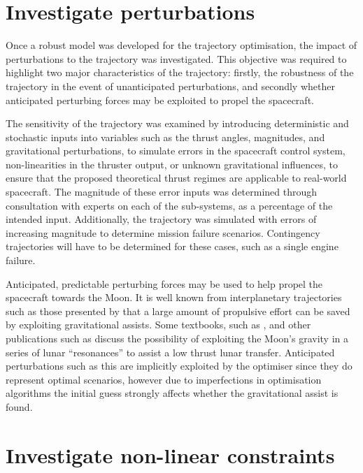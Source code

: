 \section{Investigate perturbations} \label{sec:Perturbation-objective}

Once a robust model was developed for the trajectory optimisation, the impact of perturbations to the trajectory was investigated. This objective was required to highlight two major characteristics of the trajectory: firstly, the robustness of the trajectory in the event of unanticipated perturbations, and secondly whether anticipated perturbing forces may be exploited to propel the spacecraft.

The sensitivity of the trajectory was examined by introducing deterministic and stochastic inputs into variables such as the thrust angles, magnitudes, and gravitational perturbations, to simulate errors in the spacecraft control system, non-linearities in the thruster output, or unknown gravitational influences, to ensure that the proposed theoretical thrust regimes are applicable to real-world spacecraft. The magnitude of these error inputs was determined through consultation with experts on each of the sub-systems, as a percentage of the intended input. Additionally, the trajectory was simulated with errors of increasing magnitude to determine mission failure scenarios. Contingency trajectories will have to be determined for these cases, such as a single engine failure.

Anticipated, predictable perturbing forces may be used to help propel the spacecraft towards the Moon. It is well known from interplanetary trajectories such as those presented by \textcite{Petukhov2007} that a large amount of propulsive effort can be saved by exploiting gravitational assists. Some textbooks, such as \textcite{Kemble2006}, and other publications such as \textcite{Letterio_thesis} discuss the possibility of exploiting the Moon's gravity in a series of lunar \enquote{resonances} to assist a low thrust lunar transfer. Anticipated perturbations such as this are implicitly exploited by the optimiser since they do represent optimal scenarios, however due to imperfections in optimisation algorithms the initial guess strongly affects whether the gravitational assist is found.

\section{Investigate non-linear constraints} \label{sec:Constraint-objective}

